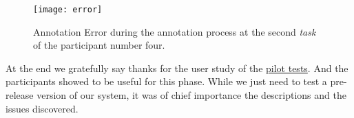 
\hfill

\begin{figure}[h]
\centering
\texttt{[image: error]}
\caption{Annotation Error during the annotation process at the second \textit{task} of the participant number four.}
\label{fig:error}
\end{figure}

\hfill


At the end we gratefully say thanks for the user study of the \hyperlink{https://www.nngroup.com/articles/pilot-testing/}{pilot tests}. And the participants showed to be useful for this phase. While we just need to test a pre-release version of our system, it was of chief importance the descriptions and the issues discovered.

